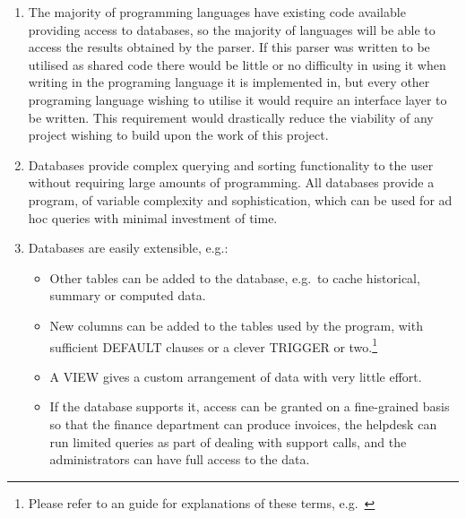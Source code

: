 \documentclass[a4paper,12pt,draft]{article}
\begin{document}
\begin{enumerate}

    \item The majority of programming languages have existing code
        available providing access to databases, so the majority of
        languages will be able to access the results obtained by the
        parser.  If this parser was written to be utilised as shared code
        there would be little or no difficulty in using it when writing in
        the programing language it is implemented in, but every other
        programing language wishing to utilise it would require an
        interface layer to be written.  This requirement would drastically
        reduce the viability of any project wishing to build upon the work
        of this project.

    \item Databases provide complex querying and sorting functionality to
        the user without requiring large amounts of programming.  All
        databases provide a program, of variable complexity and
        sophistication, which can be used for ad hoc queries with minimal
        investment of time.

    \item Databases are easily extensible, e.g.:

        \begin{itemize}

            \item Other tables can be added to the database, e.g.\ to cache
                historical, summary or computed data.

            \item New columns can be added to the tables used by the
                program, with sufficient DEFAULT clauses or a clever
                TRIGGER or two.\footnote{Please refer to an \SQL{} guide
                for explanations of these terms,
                e.g.~\cite{sql-for-web-nerds}}

            \item A VIEW gives a custom arrangement of data with very
                little effort.

            \item If the database supports it, access can be granted on a
                fine-grained basis so that the finance department can
                produce invoices, the helpdesk can run limited queries as
                part of dealing with support calls, and the administrators
                can have full access to the data.


\end{itemize}
\end{enumerate}
\end{document}
